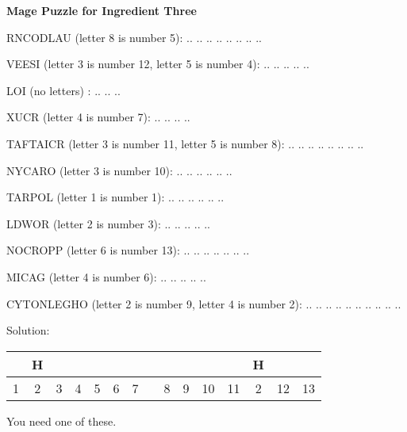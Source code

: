 \documentclass[white]{guildcamp3}
\begin{document}
\name{\wMagePuzzleThree{}} %

\large\textbf{Mage Puzzle for Ingredient Three}  


RNCODLAU (letter 8 is number 5): .. .. .. .. .. .. .. ..

VEESI (letter 3 is number 12, letter 5 is number 4): .. .. .. .. ..

LOI (no letters) : .. .. ..

XUCR (letter 4 is number 7): .. .. .. ..

TAFTAICR (letter 3 is number 11, letter 5 is number 8): .. .. .. .. .. .. .. .. 

NYCARO (letter 3 is number 10): .. .. .. .. .. ..

TARPOL (letter 1 is number 1): .. .. .. .. .. ..

LDWOR (letter 2 is number 3): .. .. .. .. ..

NOCROPP (letter 6 is number 13): .. .. .. .. .. .. ..

MICAG (letter 4 is number 6): .. .. .. .. ..

CYTONLEGHO (letter 2 is number 9, letter 4 is number 2): .. .. .. .. .. .. .. .. .. ..

Solution:

\begin{tabular}{|c|c|c|c|c|c|c|c|c|c|c|c|c|c|c|}
	\hline \rule[-2ex]{0pt}{5.5ex}  & H &  &  &  &  &  &  &  &  &  &  & H &  &  \\ 
	\hline \rule[-2ex]{0pt}{5.5ex} 1 & 2 & 3 & 4 & 5 & 6 & 7 &  & 8 & 9 & 10 & 11 & 2 & 12 & 13 \\ 
	\hline 
\end{tabular} 

You need one of these. 

\end{document}

